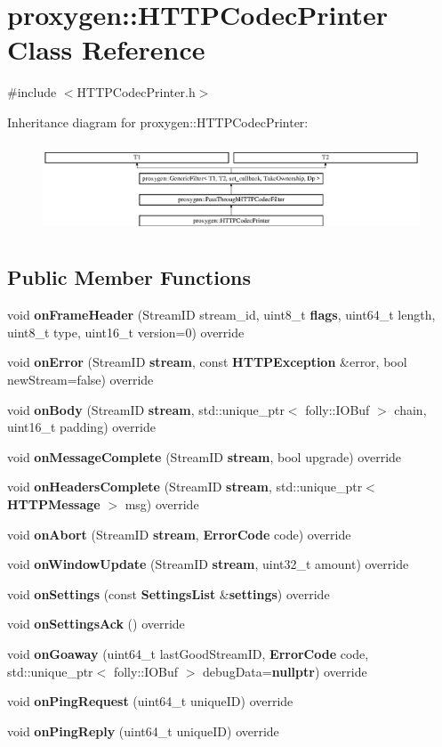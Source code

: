 \section{proxygen\+:\+:H\+T\+T\+P\+Codec\+Printer Class Reference}
\label{classproxygen_1_1HTTPCodecPrinter}


{\ttfamily \#include $<$H\+T\+T\+P\+Codec\+Printer.\+h$>$}

Inheritance diagram for proxygen\+:\+:H\+T\+T\+P\+Codec\+Printer\+:\begin{figure}[H]
\begin{center}
\leavevmode
\includegraphics[height=2.698795cm]{classproxygen_1_1HTTPCodecPrinter}
\end{center}
\end{figure}
\subsection*{Public Member Functions}
\begin{DoxyCompactItemize}
\item 
void {\bf on\+Frame\+Header} (Stream\+ID stream\+\_\+id, uint8\+\_\+t {\bf flags}, uint64\+\_\+t length, uint8\+\_\+t type, uint16\+\_\+t version=0) override
\item 
void {\bf on\+Error} (Stream\+ID {\bf stream}, const {\bf H\+T\+T\+P\+Exception} \&error, bool new\+Stream=false) override
\item 
void {\bf on\+Body} (Stream\+ID {\bf stream}, std\+::unique\+\_\+ptr$<$ folly\+::\+I\+O\+Buf $>$ chain, uint16\+\_\+t padding) override
\item 
void {\bf on\+Message\+Complete} (Stream\+ID {\bf stream}, bool upgrade) override
\item 
void {\bf on\+Headers\+Complete} (Stream\+ID {\bf stream}, std\+::unique\+\_\+ptr$<$ {\bf H\+T\+T\+P\+Message} $>$ msg) override
\item 
void {\bf on\+Abort} (Stream\+ID {\bf stream}, {\bf Error\+Code} code) override
\item 
void {\bf on\+Window\+Update} (Stream\+ID {\bf stream}, uint32\+\_\+t amount) override
\item 
void {\bf on\+Settings} (const {\bf Settings\+List} \&{\bf settings}) override
\item 
void {\bf on\+Settings\+Ack} () override
\item 
void {\bf on\+Goaway} (uint64\+\_\+t last\+Good\+Stream\+ID, {\bf Error\+Code} code, std\+::unique\+\_\+ptr$<$ folly\+::\+I\+O\+Buf $>$ debug\+Data={\bf nullptr}) override
\item 
void {\bf on\+Ping\+Request} (uint64\+\_\+t unique\+ID) override
\item 
void {\bf on\+Ping\+Reply} (uint64\+\_\+t unique\+ID) override
\end{DoxyCompactItemize}
